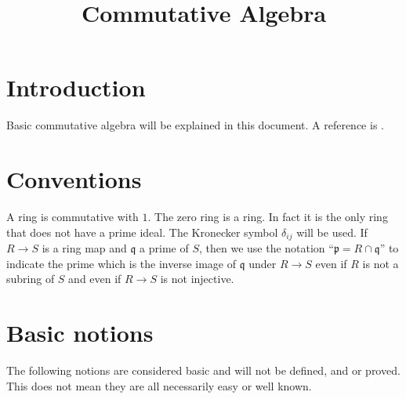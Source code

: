 

%


\title{Commutative Algebra}


\maketitle

\label{section-phantom}

\tableofcontents




\section{Introduction}
\label{section-introduction}

\noindent
Basic commutative algebra will be explained in this document.
A reference is \cite{MatCA}.






\section{Conventions}
\label{section-conventions}

\noindent
A ring is commutative with $1$. The zero ring is a ring. In fact it is
the only ring that does not have a prime ideal. The Kronecker
symbol $\delta_{ij}$ will be used. If $R \to S$ is a ring map and
$\mathfrak q$ a prime of $S$, then we use the notation
``$\mathfrak p = R \cap \mathfrak q$''
to indicate the prime which is the inverse image of $\mathfrak q$ under
$R \to S$ even if $R$ is not a subring of $S$ and even if $R \to S$
is not injective.






\section{Basic notions}
\label{section-rings-basic}

\noindent
The following notions are considered basic and will not be defined,
and or proved. This does not mean they are all necessarily easy or
well known.


